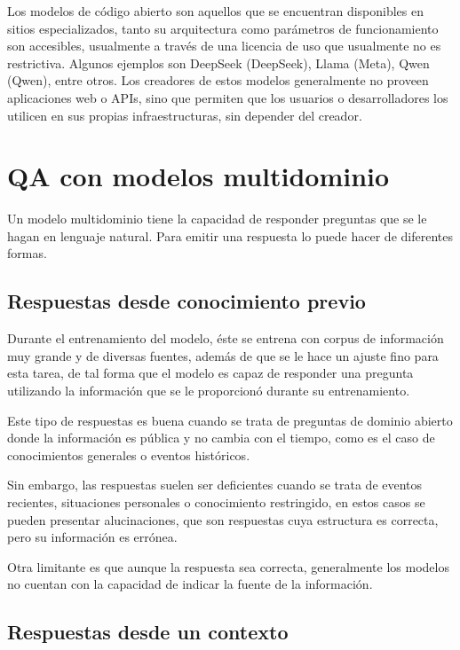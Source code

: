 Los modelos de código abierto son aquellos que se encuentran disponibles
en sitios especializados, tanto su arquitectura como parámetros de
funcionamiento son accesibles, usualmente a través de una licencia de uso
que usualmente no es restrictiva. Algunos ejemplos son DeepSeek (DeepSeek),
Llama (Meta), Qwen (Qwen), entre otros. Los creadores de estos modelos
generalmente no proveen aplicaciones web o APIs, sino que permiten que los
usuarios o desarrolladores los utilicen en sus propias infraestructuras,
sin depender del creador.

\section{QA con modelos multidominio}

Un modelo multidominio tiene la capacidad de responder preguntas que se
le hagan en lenguaje natural. Para emitir una respuesta lo puede hacer de
diferentes formas.

\subsection{Respuestas desde conocimiento previo}

Durante el entrenamiento del modelo, éste se entrena con corpus de información
muy grande y de diversas fuentes, además de que se le hace un ajuste fino
para esta tarea, de tal forma que el modelo es capaz de responder una pregunta
utilizando la información que se le proporcionó durante su entrenamiento.

Este tipo de respuestas es buena cuando se trata de preguntas de dominio abierto
donde la información es pública y no cambia con el tiempo, como es el caso
de conocimientos generales o eventos históricos.

Sin embargo, las respuestas suelen ser deficientes
cuando se trata de eventos recientes, situaciones personales o conocimiento
restringido, en estos casos se pueden presentar alucinaciones, que son
respuestas cuya estructura es correcta, pero su información es errónea.

Otra limitante es que aunque la respuesta sea correcta, generalmente los
modelos no cuentan con la capacidad de indicar la fuente de la información.

\subsection{Respuestas desde un contexto}

